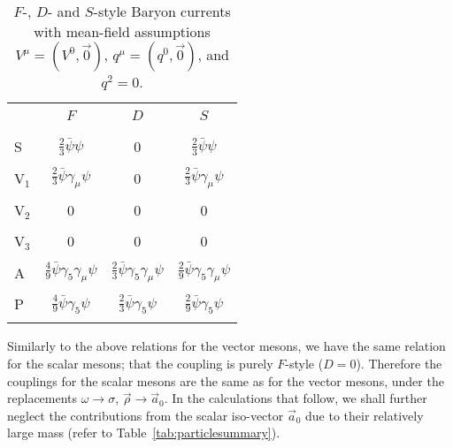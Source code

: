 \documentclass[11pt,a4paper,twoside]{carrollthesis}
\newcommand{\s}{\sigma}
\newcommand{\w}{\omega}
\begin{document}
\begin{table}[!t]
\centering
\caption[$F$-, $D$- and $S$-style baryon currents with mean-field
  assumptions]{\protect $F$-, $D$- and $S$-style Baryon currents with
  mean-field assumptions $V^\mu=(V^0,\vec{0})$, $q^\mu=(q^0,\vec{0})$,
  and $q^2=0$. \label{tab:currentassumptions}}
\vspace{3mm}
\begin{tabular}{lccc}
\hline 
\hline 
&&&\\[-4mm]
   &     $F$    &    $D$    &    $S$ \\
&&&\\[-4mm]
\hline
&&&\\[-2mm]
S  & $\frac{2}{3}\bar{\psi}\psi$ & 0 & $\frac{2}{3}\bar{\psi}\psi$ \\
&&&\\[-2mm]
V${}_1$ & $\frac{2}{3}\bar{\psi}\gamma_\mu\psi$ & 0 & $\frac{2}{3}\bar{\psi}\gamma_\mu\psi$ \\
&&&\\[-2mm]
V${}_2$ & 0 & 0 & 0 \\
&&&\\[-2mm]
V${}_3$ &  0  &  0  &  0  \\
&&&\\[-2mm]
A & $ \frac{4}{9}\bar{\psi}\gamma_5\gamma_\mu\psi $ &
    $ \frac{2}{3}\bar{\psi}\gamma_5\gamma_\mu\psi $    & 
    $ \frac{2}{9}\bar{\psi}\gamma_5\gamma_\mu\psi $ \\
&&&\\[-2mm]
P & $ \frac{4}{9}\bar{\psi}\gamma_5\psi $ &
    $ \frac{2}{3}\bar{\psi}\gamma_5\psi $    & 
    $ \frac{2}{9}\bar{\psi}\gamma_5\psi $ \\
&&&\\[-2mm]
\hline
\hline
\end{tabular}
\end{table}
%
Similarly to the above relations for the vector mesons, we have the
same relation for the scalar mesons; that the coupling is purely
$F$-style ($D=0$). Therefore the couplings for the scalar mesons are
the same as for the vector mesons, under the replacements $\w \to \s$,
$\vec{\rho} \to \vec{a}_0$. In the calculations that follow, we shall
further neglect the contributions from the scalar iso-vector
$\vec{a}_0$ due to their relatively large mass (refer to
Table~\ref{tab:particlesummary}).\par
%
\end{document}
